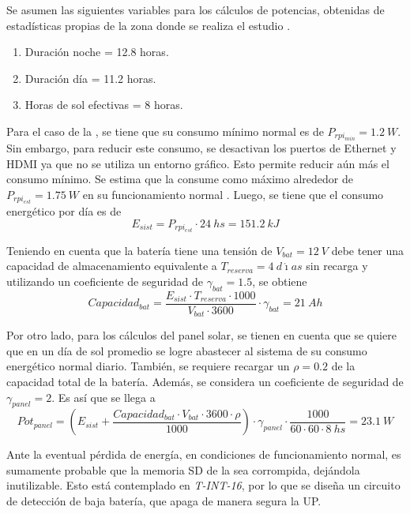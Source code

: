 Se asumen las siguientes variables para los cálculos de potencias, obtenidas de estadísticas propias de la zona donde se realiza el estudio \cite{ref:weather_bariloche}.
\begin{enumerate}
	\item Duración noche = 12.8 horas.
	\item Duración día = 11.2 horas.
	\item Horas de sol efectivas = 8 horas.
\end{enumerate}

Para el caso de la \rpi, se tiene que su consumo mínimo normal es de $P_{rpi_{min}} = 1.2 \ W$. Sin embargo, para reducir este consumo, se desactivan los puertos de Ethernet y HDMI ya que no se utiliza un entorno gráfico. Esto permite reducir aún más el consumo mínimo. Se estima que la \rspi consume como máximo alrededor de $P_{rpi_{est}} = 1.75 \ W$ en su funcionamiento normal \cite{ref:pot_rpi}. Luego, se tiene que el consumo energético por día es de
\begin{equation}
	E_{sist} = P_{rpi_{est}}\cdot 24 \ hs = 151.2 \ kJ
\end{equation}

Teniendo en cuenta que la batería tiene una tensión de $V_{bat} = 12 \ V$ debe tener una capacidad de almacenamiento equivalente a $T_{reserva} = 4 \ d\acute{\imath}as$ sin recarga \cite{ref:weather_bariloche} y utilizando un coeficiente de seguridad de $\gamma_{bat} = 1.5$, se obtiene
\begin{equation}
	Capacidad_{bat} = \frac{E_{sist}\cdot T_{reserva}\cdot 1000}{V_{bat}\cdot 3600}\cdot \gamma_{bat} = 21 \ Ah
\end{equation}

Por otro lado, para los cálculos del panel solar, se tienen en cuenta que se quiere que en un día de sol promedio se logre abastecer al sistema de su consumo energético normal diario. También, se requiere recargar un $\rho = 0.2$ de la capacidad total de la batería. Además, se considera un coeficiente de seguridad de $\gamma_{panel} = 2$. Es así que se llega a
\begin{equation}
	Pot_{panel} = \left( E_{sist} + \frac{Capacidad_{bat}\cdot V_{bat}\cdot 3600\cdot \rho}{1000}\right)\cdot \gamma_{panel} \cdot  \frac{1000}{60\cdot 60\cdot 8 \ hs} = 23.1 \ W
\end{equation}

Ante la eventual pérdida de energía, en condiciones de funcionamiento normal, es sumamente probable que la memoria SD de la \rspi sea corrompida, dejándola inutilizable. Esto está contemplado en \textit{T-INT-16}, por lo que se diseña un circuito de detección de baja batería, que apaga de manera segura la UP.

